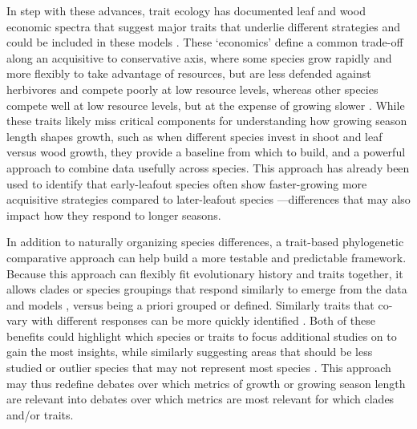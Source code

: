 \documentclass[11pt]{article}
\begin{document}
In step with these advances, trait ecology has documented leaf and wood economic spectra that suggest major traits that underlie different strategies and could be included in these models \citep[with related databases of these traits often available,][]{Chave2009,diaz2016}. These `economics' define a common trade-off along an acquisitive to conservative axis, where some species grow rapidly and more flexibly to take advantage of resources, but are less defended against herbivores and compete poorly at low resource levels, whereas other species compete well at low resource levels, but at the expense of growing slower  \citep[][]{Grime:1977sw,Chave2009,diaz2016}. While these traits likely miss critical components for understanding how growing season length shapes growth, such as when different species invest in shoot and leaf versus wood growth, they provide a baseline from which to build, and a powerful approach to combine data usefully across species. This approach has already been used to identify that early-leafout species often show faster-growing more acquisitive strategies compared to later-leafout species \citep[reviewed in][]{cleland2024effects}---differences that may also impact how they respond to longer seasons. 

In addition to naturally organizing species differences, a trait-based phylogenetic comparative approach can help build a more testable and predictable framework. %
Because this approach can flexibly fit evolutionary history and traits together, it allows clades or species groupings that respond similarly to emerge from the data and models \citep{davies2019phylogenetically}, versus being a priori grouped or defined. Similarly traits that co-vary with different responses can be more quickly identified \citep[e.g.][see Fig. \ref{fig:phylomodel}]{willis2008phylogenetic,davies2019phylogenetically}. Both of these benefits could highlight which species or traits to focus additional studies on to gain the most insights, while similarly suggesting areas that should be less studied \citep[e.g. traits that may be too confounded with evolutionary history,][]{cornwell2014functional,westoby2023phylogenetically} or outlier species that may not represent most species \citep{morales2024phylogenetic}. This approach may thus redefine debates over which metrics of growth or growing season length are relevant into debates over which metrics are most relevant for which clades and/or traits.%
\end{document}
